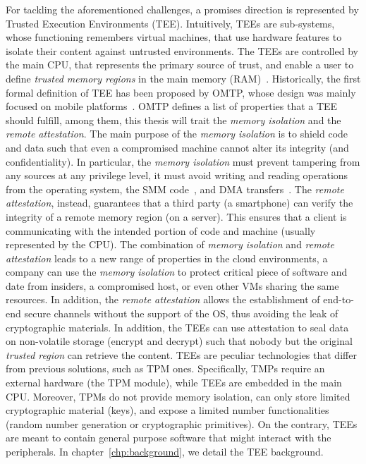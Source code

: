 For tackling the aforementioned challenges, a promises direction is 
represented by Trusted Execution Environments (TEE).
Intuitively, TEEs are sub-systems, whose functioning remembers virtual 
machines, that use hardware features to isolate their content against untrusted 
environments.
The TEEs are controlled by the main CPU, that represents the primary source of 
trust, and enable a user to define \emph{trusted memory regions} in the main 
memory (RAM)~\citep{Sabt2015TrustedEE}.
Historically, the first formal definition of TEE has been proposed by OMTP, 
whose design was mainly focused on mobile platforms~\citep{omtp}.
OMTP defines a list of properties that a TEE should fulfill, among them, this 
thesis will trait the \emph{memory isolation} and the \emph{remote attestation}.
The main purpose of the \emph{memory isolation} is to shield code and data such 
that even a compromised machine cannot alter its integrity (and 
confidentiality).
In particular, the \emph{memory isolation} must prevent tampering from any 
sources at any privilege level, \eg it must avoid writing and reading 
operations from the operating system, the SMM code~\citep{yao2009system}, and 
DMA transfers~\citep{coke1998implementing}.
The \emph{remote attestation}, instead, guarantees that a third party (\eg a 
smartphone) can verify the integrity of a remote memory region (\eg on a 
server).
This ensures that a client is communicating with the intended portion of code 
and machine (usually represented by the CPU).
The combination of \emph{memory isolation} and \emph{remote attestation} leads 
to a new range of properties in the cloud environments, \ie a company 
can use the \emph{memory isolation} to protect critical piece of 
software and date from insiders, a compromised host, or even other VMs sharing 
the same resources.
In addition, the \emph{remote attestation} allows the establishment of 
end-to-end secure channels without the support of the OS, thus avoiding the 
leak of cryptographic materials.
In addition, the TEEs can use attestation to seal data on non-volatile storage 
(\ie encrypt and decrypt) such that nobody but the original \emph{trusted 
region} can retrieve the content. 
TEEs are peculiar technologies that differ from previous solutions, such as TPM 
ones. Specifically, TMPs require an external hardware (\ie the TPM module), 
while TEEs are embedded in the main CPU.
Moreover, TPMs do not provide memory isolation, can only store limited 
cryptographic material (\eg keys), and expose a limited number functionalities 
(\eg random number generation or cryptographic primitives).
On the contrary, TEEs are meant to contain general purpose software that might 
interact with the peripherals.
In chapter~\ref{chp:background}, we detail the TEE background.

